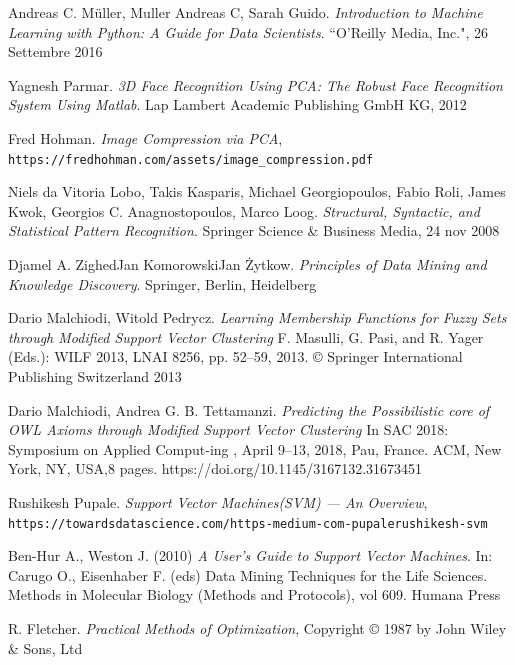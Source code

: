 \documentclass[12pt,italian]{report}
\begin{document}
\begin{thebibliography}{9}
	Andreas C. Müller, Muller Andreas C, Sarah Guido. 
	\textit{Introduction to Machine Learning with Python: A Guide for Data Scientists}. 
	``O'Reilly Media, Inc.", 26 Settembre 2016

	Yagnesh Parmar. 
	\textit{3D Face Recognition Using PCA: The Robust Face Recognition System Using Matlab}. 
	Lap Lambert Academic Publishing GmbH KG, 2012

	Fred Hohman. \textit{Image Compression via PCA}, \\\texttt{https://fredhohman.com/assets/image\_compression.pdf}

	Niels da Vitoria Lobo, Takis Kasparis, Michael Georgiopoulos, Fabio Roli, James Kwok, Georgios C. Anagnostopoulos, Marco Loog. \textit{Structural, Syntactic, and Statistical Pattern Recognition}. 
	Springer Science \& Business Media, 24 nov 2008

	Djamel A. ZighedJan KomorowskiJan Żytkow. \textit{Principles of Data Mining and Knowledge Discovery}. 
	Springer, Berlin, Heidelberg
	
	Dario Malchiodi, Witold Pedrycz.
	\textit{Learning Membership Functions for Fuzzy Sets
	through Modified Support Vector Clustering}
	F. Masulli, G. Pasi, and R. Yager (Eds.): WILF 2013, LNAI 8256, pp. 52–59, 2013.
	© Springer International Publishing Switzerland 2013
 
	Dario Malchiodi, Andrea G. B. Tettamanzi.
	\textit{Predicting the Possibilistic core of OWL Axioms through Modified Support Vector Clustering}
	In SAC 2018: Symposium on Applied Comput-ing , April 9–13, 2018, Pau, France. ACM, New York, NY, USA,8 pages. https://doi.org/10.1145/3167132.31673451
 	
 	Rushikesh Pupale. \textit{Support Vector Machines(SVM) — An Overview}, \\\texttt{https://towardsdatascience.com/https-medium-com-pupalerushikesh-svm}
 	
	Ben-Hur A., Weston J. (2010) \textit{A User’s Guide to Support Vector Machines}. In: Carugo O., Eisenhaber F. (eds) Data Mining Techniques for the Life Sciences. Methods in Molecular Biology (Methods and Protocols), vol 609. Humana Press
 	
 	
  	R. Fletcher. \textit{Practical Methods of Optimization}, 
  	Copyright © 1987 by John Wiley \& Sons, Ltd
 	

\end{thebibliography}
\end{document}
